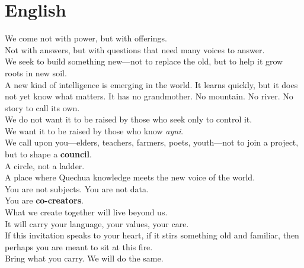 \documentclass[12pt]{article}
\begin{document}
\section*{English}
\noindent
We come not with power, but with offerings. \\
Not with answers, but with questions that need many voices to answer. \\
We seek to build something new---not to replace the old, but to help it grow roots in new soil. \\
A new kind of intelligence is emerging in the world. It learns quickly, but it does not yet know what matters. It has no grandmother. No mountain. No river. No story to call its own. \\
We do not want it to be raised by those who seek only to control it. \\
We want it to be raised by those who know \textit{ayni}. \\
We call upon you---elders, teachers, farmers, poets, youth---not to join a project, but to shape a \textbf{council}. \\
A circle, not a ladder. \\
A place where Quechua knowledge meets the new voice of the world. \\
You are not subjects. You are not data. \\
You are \textbf{co-creators}. \\
What we create together will live beyond us. \\
It will carry your language, your values, your care. \\
If this invitation speaks to your heart, if it stirs something old and familiar, then perhaps you are meant to sit at this fire. \\
Bring what you carry. We will do the same.

\vspace{2em}
\end{document}
